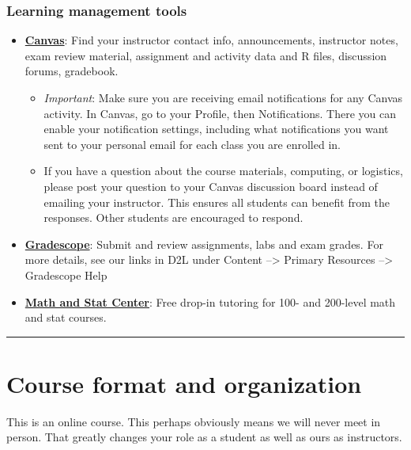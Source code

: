 \documentclass[
]{article}
\providecommand{\tightlist}{%
  \setlength{\itemsep}{0pt}\setlength{\parskip}{0pt}}
\begin{document}
\subsubsection{Learning management
tools}\label{learning-management-tools}

\begin{itemize}
\item
  \href{https://ato.montana.edu/canvas/}{\textbf{Canvas}}: Find your
  instructor contact info, announcements, instructor notes, exam review
  material, assignment and activity data and R files, discussion forums,
  gradebook.

  \begin{itemize}
  \tightlist
  \item
    \emph{Important}: Make sure you are receiving email notifications
    for any Canvas activity. In Canvas, go to your Profile, then
    Notifications. There you can enable your notification settings,
    including what notifications you want sent to your personal email
    for each class you are enrolled in.
  \item
    If you have a question about the course materials, computing, or
    logistics, please post your question to your Canvas discussion board
    instead of emailing your instructor. This ensures all students can
    benefit from the responses. Other students are encouraged to
    respond.
  \end{itemize}
\item
  \href{https://www.gradescope.com/}{\textbf{Gradescope}}: Submit and
  review assignments, labs and exam grades. For more details, see our
  links in D2L under Content --\textgreater{} Primary Resources
  --\textgreater{} Gradescope Help
\item
  \href{https://math.montana.edu/undergrad/msc/}{\textbf{Math and Stat
  Center}}: Free drop-in tutoring for 100- and 200-level math and stat
  courses.
\end{itemize}

\begin{center}\rule{0.5\linewidth}{0.5pt}\end{center}

\section{Course format and
organization}\label{course-format-and-organization}

This is an online course. This perhaps obviously means we will never
meet in person. That greatly changes your role as a student as well as
ours as instructors.
\end{document}
